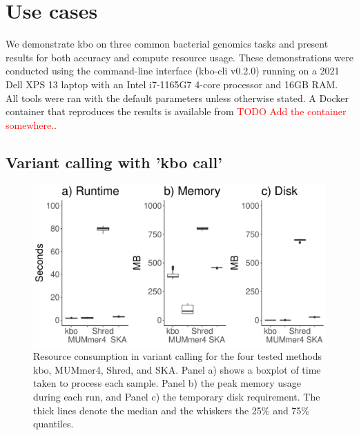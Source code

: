 \documentclass[unnumsec,webpdf,contemporary,large]{oup-authoring-template}%
\theoremstyle{thmstyleone}%
\theoremstyle{thmstyletwo}%
\theoremstyle{thmstylethree}%
\begin{document}
\section{Use cases}
We demonstrate {\sf kbo} on three common bacterial genomics tasks and present results for both accuracy and compute resource usage. These demonstrations were conducted using the command-line interface (kbo-cli v0.2.0) running on a 2021 Dell XPS 13 laptop with an Intel i7-1165G7 4-core processor and 16GB RAM. All tools were ran with the default parameters unless otherwise stated. A Docker container that reproduces the results is available from \textcolor{red}{TODO Add the container somewhere.}.

\subsection{Variant calling with 'kbo call'}
\begin{figure}
    \centering
    \includegraphics[width=1.0\linewidth]{fig/variant_calling_resource_consumption.pdf}
    \caption{Resource consumption in variant calling for the four tested methods kbo, MUMmer4, Shred, and SKA. Panel a) shows a boxplot of time taken to process each sample. Panel b) the peak memory usage during each run, and Panel c) the temporary disk requirement. The thick lines denote the median and the whiskers the 25\% and 75\% quantiles.}
    \label{fig:vc-resource-usage}
\end{figure}
\end{document}

